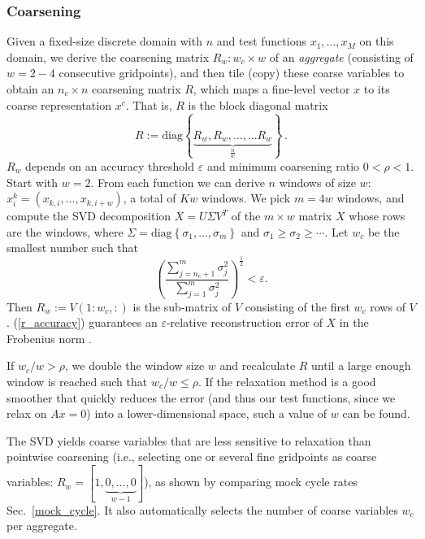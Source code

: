 \documentclass{article}
\begin{document}
\subsubsection{Coarsening}
Given a fixed-size discrete domain with $n$ and test functions $x_1,\dots,x_M$ on this domain, we derive the coarsening matrix $R_w: w_c \times w$ of an \emph{aggregate} (consisting of $w = 2-4$ consecutive gridpoints), and then tile (copy) these coarse variables to obtain an $n_c \times n$ coarsening matrix $R$, which maps a fine-level vector $x$ to its coarse representation $x^c$. That is, $R$ is the block diagonal matrix
\begin{equation}
	R := \text{diag} \left\{ \underbrace{R_w, R_w, \dots, ... R_w }_{\frac{n}{w}}  \right\} \,.
\end{equation}
$R_w$ depends on an accuracy threshold $\varepsilon$ and minimum coarsening ratio $0 < \rho < 1$. Start with $w = 2$. From each function we can derive $n$ windows of size $w$: $x^k_i = (x_{k,i},\dots,x_{k,i+w})$, a total of $Kw$ windows. We pick $m = 4 w$ windows, and compute the SVD decomposition $X = U \Sigma V^T$ of the $m \times w$ matrix $X$ whose rows are the windows, where $\Sigma = \text{diag}\left\{\sigma_1, \dots, \sigma_m \right\}$ and $\sigma_1 \geq \sigma_2 \geq \cdots$. Let $w_c$ be the smallest number such that
\begin{equation}
	\left(\frac{\sum_{j=n_c+1}^m \sigma_j^2}{\sum_{j=1}^m \sigma_j^2 } \right)^{\frac12} < \varepsilon.
	\label{r_accuracy}
\end{equation}
Then $R_w := V(1:w_c,:)$ is the sub-matrix of $V$ consisting of the first $w_c$ rows of $V$. (\ref{r_accuracy}) guarantees an $\varepsilon$-relative reconstruction error of $X$ in the Frobenius norm \cite{svd}.

If $w_c/w > \rho$, we double the window size $w$ and recalculate $R$ until a large enough window is reached such that $w_c/w \leq \rho$. If the relaxation method is a good smoother that quickly reduces the error (and thus our test functions, since we relax on $A x = 0$) into a lower-dimensional space, such a value of $w$ can be found.

The SVD yields coarse variables that are less sensitive to relaxation than pointwise coarsening (i.e., selecting one or several fine gridpoints as coarse variables: $R_w = [1,\underbrace{0,\dots,0}_{w-1}]$), as shown by comparing mock cycle rates Sec.~\ref{mock_cycle}. It also automatically selects the number of coarse variables $w_c$ per aggregate.
\end{document}
